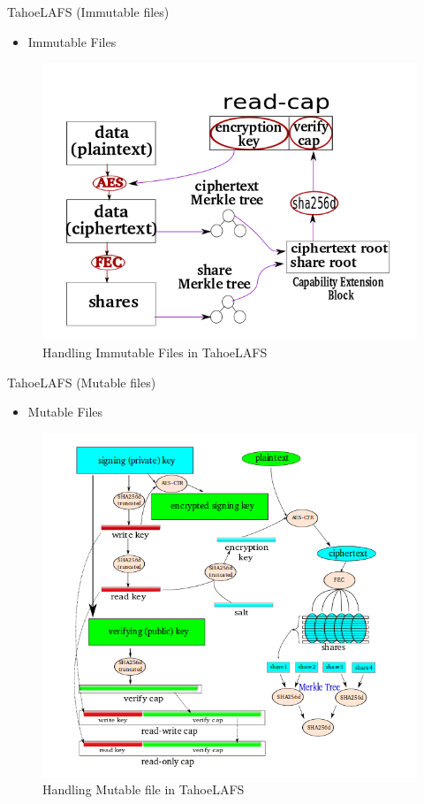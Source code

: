 \documentclass[11pt]{beamer}
\begin{document}
\begin{frame}{TahoeLAFS (Immutable files)}
    \vfill
    \begin{itemize}
    \item Immutable Files
    \end{itemize}
    \vfill
    \begin{figure}
		  \includegraphics[scale=0.3]{img/immutable.png}
		  \caption{Handling Immutable Files in TahoeLAFS}
    \end{figure}
    \vfill
\end{frame}

\begin{frame}{TahoeLAFS (Mutable files)}
    \vfill
    \begin{itemize}
    \item Mutable Files
    \end{itemize}
    \vfill
    \begin{figure}
		  \includegraphics[scale=0.3]{img/mutable.png}
		  \caption{Handling Mutable file in TahoeLAFS}
    \end{figure}
    \vfill
\end{frame}
\end{document}
